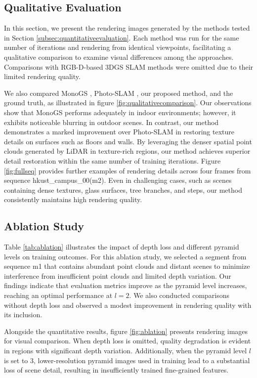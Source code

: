 \documentclass[lettersize,journal]{IEEEtran}
\begin{document}
\subsection{Qualitative Evaluation}
In this section, we present the rendering images generated by the methods tested in Section \ref{subsec:quantitativeevaluation}. Each method was run for the same number of iterations and rendering from identical viewpoints, facilitating a qualitative comparison to examine visual differences among the approaches. Comparisons with RGB-D-based 3DGS SLAM methods were omitted due to their limited rendering quality.

We also compared MonoGS \cite{monogs}, Photo-SLAM \cite{photoslam}, our proposed method, and the ground truth, as illustrated in figure \ref{fig:qualitativecomparison}. Our observations show that MonoGS \cite{monogs} performs adequately in indoor environments; however, it exhibits noticeable blurring in outdoor scenes. In contrast, our method demonstrates a marked improvement over Photo-SLAM \cite{photoslam} in restoring texture details on surfaces such as floors and walls. By leveraging the denser spatial point clouds generated by LiDAR in texture-rich regions, our method achieves superior detail restoration within the same number of training iterations. Figure \ref{fig:fullseq} provides further examples of rendering details across four frames from sequence hkust_campus_00(m2)\cite{r3live}. Even in challenging cases, such as scenes containing dense textures, glass surfaces, tree branches, and steps, our method consistently maintains high rendering quality.

\subsection{Ablation Study}

Table \ref{tab:ablation} illustrates the impact of depth loss and different pyramid levels on training outcomes. For this ablation study, we selected a segment from sequence m1 that contains abundant point clouds and distant scenes to minimize interference from insufficient point clouds and limited depth variation. Our findings indicate that evaluation metrics improve as the pyramid level increases, reaching an optimal performance at $l=2$. We also conducted comparisons without depth loss and observed a modest improvement in rendering quality with its inclusion.

Alongside the quantitative results, figure \ref{fig:ablation} presents rendering images for visual comparison. When depth loss is omitted, quality degradation is evident in regions with significant depth variation. Additionally, when the pyramid level $l$ is set to 3, lower-resolution pyramid images used in training lead to a substantial loss of scene detail, resulting in insufficiently trained fine-grained features.
\end{document}
